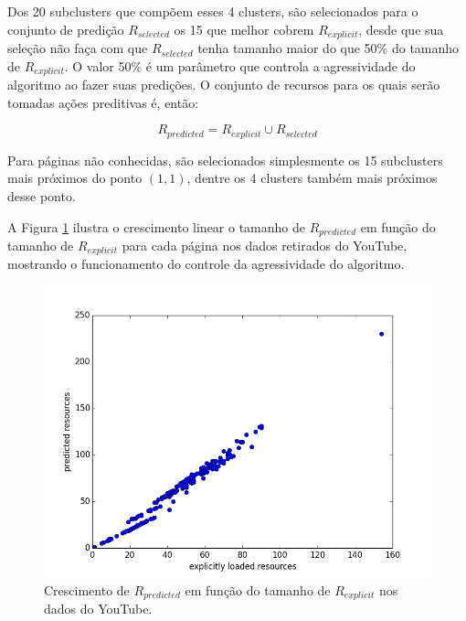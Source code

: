 \documentclass[10pt,twocolumn,letterpaper]{article}
\begin{document}
Dos 20 subclusters que compõem esses 4 clusters, são selecionados para o conjunto de predição $R_{selected}$ os 15 que melhor cobrem $R_{explicit}$, desde que sua seleção não faça com que $R_{selected}$ tenha tamanho maior do que 50\% do tamanho de $R_{explicit}$. O valor 50\% é um parâmetro que controla a agressividade do algoritmo ao fazer suas predições. O conjunto de recursos para os quais serão tomadas ações preditivas é, então:

\begin{equation}
R_{predicted} = R_{explicit} \cup R_{selected}
\end{equation}

Para páginas não conhecidas, são selecionados simplesmente os 15 subclusters mais próximos do ponto $(1, 1)$, dentre os 4 clusters também mais próximos desse ponto.

A Figura \ref{fig-youtube-explicit-vs-predicted} ilustra o crescimento linear o tamanho de $R_{predicted}$ em função do tamanho de $R_{explicit}$ para cada página nos dados retirados do YouTube, mostrando o funcionamento do controle da agressividade do algoritmo.

\begin{figure}
	\begin{center}
     \includegraphics[width=0.99\columnwidth]{pics/youtube_explicit_vs_predicted.png}
    \caption{Crescimento de $R_{predicted}$ em função do tamanho de $R_{explicit}$ nos dados do YouTube.}
    \label{fig-youtube-explicit-vs-predicted}   
	\end{center} 
\end{figure}
\end{document}
